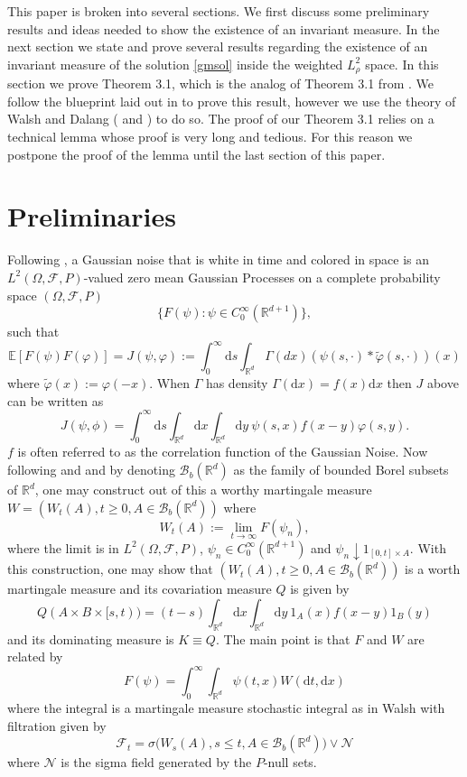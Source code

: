 \documentclass{article}
\numberwithin{equation}{section}
\newcommand{\R}{\mathbb{R}}
\newcommand{\E}{\mathbb{E}}
\newcommand{\ud}{\ensuremath{\mathrm{d}}}
\begin{document}
This paper is broken into several sections. We first discuss some preliminary results and ideas needed to show the existence of an invariant measure. In the next section we state and prove several results regarding the existence of an invariant measure of the solution \eqref{gmsol} inside the weighted $L^2_\rho$ space. In this section we prove Theorem 3.1, which is the analog of Theorem 3.1 from \cite{TessitoreZabczyk98M}. We follow the blueprint laid out in \cite{TessitoreZabczyk98M} to prove this result, however we use the theory of Walsh and Dalang (\cite{Walsh} and \cite{DalangEtc09Minicourse}) to do so. The proof of our Theorem 3.1 relies on a technical lemma whose proof is very long and tedious. For this reason we postpone the proof of the lemma until the last section of this paper. 

\section{Preliminaries} 

Following \cite{DalangEtc09Minicourse}, a Gaussian noise that is white in time and colored in space is an $L^2(\Omega,\mathcal F,P)$-valued zero mean Gaussian Processes on a complete probability space $(\Omega,\mathcal F,P)$
$$ \{ F(\psi) : \psi \in C_0^\infty(\R^{d+1}) \} ,$$
such that 
$$ \E [ F(\psi)F(\varphi) ] = J(\psi,\varphi) := \int_0^\infty \ud s \int_{\R^d} \Gamma(dx)(\psi(s,\cdot)*\tilde{\varphi}(s,\cdot))(x)$$
 where $\tilde{\varphi}(x):= \varphi(-x)$. When $\Gamma$ has density $\Gamma(\ud x) = f(x)\ud x$ then $J$ above can be written as 
$$ J(\psi,\phi) = \int_0^\infty \ud s \int_{\R^d} \ud x \int_{\R^d} \ud y \: \psi(s,x)f(x-y)\varphi(s,y). $$
$f$ is often referred to as the correlation function of the Gaussian Noise. Now following \cite{Walsh} and \cite{DalangEtc09Minicourse} and by denoting $\mathscr B_b(\R^d)$ as the family of bounded Borel subsets of $\R^d$, one may construct out of this a worthy martingale measure $W=(W_t(A),t\ge 0, A \in \mathscr B_b(\R^d))$ where 
$$ W_t(A):= \lim \limits_{t\to \infty} F(\psi_n),  $$
where the limit is in $L^2(\Omega,\mathcal F,P)$, $\psi_n \in C_0^\infty(\R^{d+1})$ and $\psi_n \downarrow 1_{[0,t]\times A}. $ With this construction, one may show that $(W_t(A),t\ge 0, A \in \mathscr B_b(\R^d))$ is a worth martingale measure and its covariation measure $Q$ is given by 
$$ Q(A \times B \times [s,t)) = (t-s)\int_{\R^d} \ud x \int_{\R^d} \ud y \: 1_A(x)f(x-y)1_B(y) $$
and its dominating measure is $K \equiv Q$. The main point is that $F$ and $W$ are related by 
$$ F(\psi) = \int_0^\infty \int_{\R^d} \psi (t,x) W(\ud t, \ud x) $$
where the integral is a martingale measure stochastic integral as in Walsh with filtration given by 
$$\mathcal F_t = \sigma \big(W_s(A), s \le t, A \in \mathscr B_b(\R^d) \big) \vee \mathscr N $$ 
where $\mathscr N$ is the sigma field generated by the $P$-null sets. 
\end{document}
